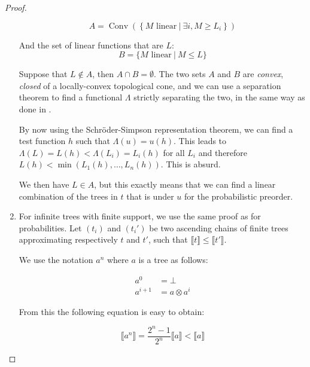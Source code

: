 \begin{proof}
\begin{enumerate}
            \begin{equation*}
                A = \operatorname{Conv}\left( \left\{ M \text{ linear} ~|~ \exists i, M
                \geq L_i \right\} \right)
            \end{equation*}

            And the set of linear functions that are $L$:
            \begin{equation*}
                B = \{ M \text{ linear} ~|~ M \leq L \}
            \end{equation*}

            Suppose that $L \not \in A$, then $A \cap B = \emptyset$.
            The two sets $A$ and $B$ are \emph{convex}, \emph{closed} of 
            a locally-convex topological cone, and we can use a separation theorem to find a 
            functional $\Lambda$ strictly separating the two, in the same 
            way as done in \cite{JGL-mscs16}.

            By now using the Schröder-Simpson representation theorem, 
            we can find a test function $h$ such that $\Lambda (u) = u(h)$. 
            This leads to $\Lambda (L) = L(h) < \Lambda (L_i) = L_i (h)$ for all $L_i$
            and therefore $L(h) < \min (L_1 (h), \dots, L_n(h))$. This is
            absurd.

            We then have $L \in A$, but this exactly means that we can find 
            a linear combination of the trees in $t$ that is under $u$
            for the probabilistic preorder.

        \item For infinite trees with finite 
            support, we use the same proof as 
            for probabilities. 
            Let $(t_i)$ and $(t_i')$ be two
            ascending chains of finite trees 
            approximating respectively $t$ and $t'$,
            such that $\llbracket t \rrbracket \leq \llbracket t' \rrbracket$.

            We use the notation $a^n$ where $a$ is a tree as follows:
            
            \begin{align*}
                a^0 &= \bot \\
                a^{i+1} &= a \otimes a^i
            \end{align*}

            From this the following equation is easy to obtain:
            
            \begin{equation*}
                \llbracket a^n \rrbracket 
                = 
                \frac{2^n - 1}{2^n} \llbracket a \rrbracket
                < \llbracket a \rrbracket
            \end{equation*}


\end{enumerate}
\end{proof}
